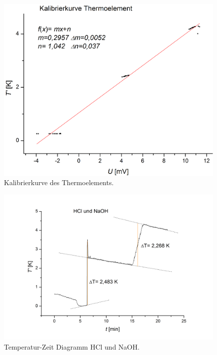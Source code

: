 \documentclass[12pt,a4paper,titlepage,headinclude,bibtotoc]{scrartcl}
\begin{document}
\begin{figure}[h] \label{Kalibrierkurve Thermoelement}
\centering
\includegraphics[width=13.5cm]{KalibrierkurveThermoelementOrigin.png}
\caption{Kalibrierkurve des Thermoelements.}
\end{figure} 
\FloatBarrier



\begin{figure}[h] \label{HClundNaOH}
\centering
\includegraphics[width=13.5cm]{HClundNaOH.png}
\caption{Temperatur-Zeit Diagramm HCl und NaOH.}
\end{figure} 
\FloatBarrier
\end{document}

